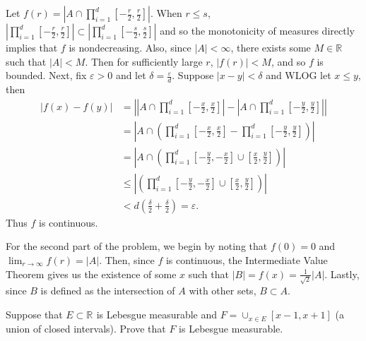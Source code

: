 \begin{solution}
  Let $f(r) = \left| A \cap \prod_{i=1}^{d } [-\frac{r}{2}, \frac{r}{2}] \right|$.
  When $r\leq s$, $\left| \prod_{i=1}^{d } [-\frac{r}{2}, \frac{r}{2}] \right| \subset \left| \prod_{i=1}^{d } [-\frac{s}{2}, \frac{s}{2}] \right|$ and so the monotonicity of measures directly implies that $f$ is nondecreasing.
  Also, since $\left| A \right| < \infty$, there exists some $M \in \mathbb{R}^{}$ such that $\left| A \right| < M$.
  Then for sufficiently large $r$, $\left| f(r) \right| < M$, and so $f$ is bounded.
  Next, fix $\varepsilon > 0$ and let $\delta = \frac{\varepsilon}{d}$.
  Suppose $\left| x - y \right| < \delta$ and WLOG let $x \leq  y$, then
    \begin{align*}
      \left| f(x) - f(y) \right| &= \left| \left| A \cap \prod_{i=1}^{d } [-\frac{x}{2}, \frac{x}{2}] \right| - \left| A \cap \prod_{i=1}^{d } [-\frac{y}{2}, \frac{y}{2}] \right| \right| \\
                                 &= \left| A \cap \left( \prod_{i=1}^{d } [-\frac{x}{2}, \frac{x}{2}] - \prod_{i=1}^{d } [-\frac{y}{2}, \frac{y}{2}] \right) \right| \tag{Class Corollary}\\
                                 &= \left| A \cap \left( \prod_{i=1}^{d } [-\frac{y}{2}, -\frac{x}{2}] \cup  [\frac{x}{2}, \frac{y}{2}] \right) \right| \\
                                 &\leq \left| \left( \prod_{i=1}^{d } [-\frac{y}{2}, -\frac{x}{2}] \cup  [\frac{x}{2}, \frac{y}{2}] \right) \right| \tag{Monotonicity} \\
                                 &< d \left( \frac{\delta}{2} + \frac{\delta}{2} \right) = \varepsilon 
    .\end{align*}
  Thus $f$ is continuous.

  For the second part of the problem, we begin by noting that $f(0) = 0$ and \\$\lim_{r \to \infty}f(r) = \left| A \right| $.
  Then, since $f$ is continuous, the Intermediate Value Theorem gives us the existence of some $x$ such that $\left| B \right| = f(x) = \frac{1}{\sqrt{2} }\left| A \right|$.
  Lastly, since $B$ is defined as the intersection of $A$ with other sets, $B \subset A$.

  

\end{solution}

\begin{problem}{4}
Suppose that $E \subset \mathbb{R}^{}$ is Lebesgue measurable and $F = \cup_{x \in E}^{} \left[ x-1,x+1 \right]$ (a union of closed intervals).
Prove that $F$ is Lebesgue measurable.
\end{problem}

